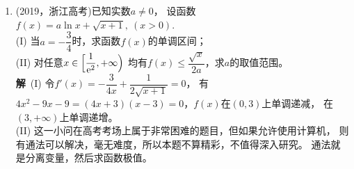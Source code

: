 \begin{enumerate}[label={【\textbf{例\thechapter.\arabic*}】},
 leftmargin=\inteval{\myenumleftmargin}pt,
 itemsep=\inteval{\myenumitempsep}pt,
 itemindent=\inteval{\myenumitemindent}pt]
令$ \ln\sqrt{2}=\ln(b-1+\sqrt{b^2-2b}) $，解得$ b=\dfrac{4+3\sqrt{2}}{4} $.那么当$ b=\dfrac{4+3\sqrt{2}}{4} $时，
$ g(x) $在$ (0,\ln\sqrt{2}) $上单调递减，
\begin{gather*}
    g(\ln\sqrt{2})=-\dfrac{3}{2}-2\sqrt{2}+(3\sqrt{2}-2)
    \ln 2<g(0)=0 \\
    \ln 2<\dfrac{18+\sqrt{2}}{18}<0.6934
\end{gather*}
所以，$ \ln 2 $的近似值为$ 0.693 $. \\
\textbf{注}：面对第(III)问，首先容易想到的是$ f(\ln\sqrt{2})=\dfrac{\sqrt{2}}{2}
-\ln 2>0 $，$ \ln 2<\dfrac{\sqrt{2}}{2}<0.70715 $，这个数字太大了，
根本达不到$ 0.001 $的精度。为何利用$ g(x) $就能提高估算精度呢？
这是因为，当$ |x| $很小时，$ g(x) $比$ f(x) $更贴近$ x $轴。
\begin{figure}[!ht]
    \centering
    \texttt{[image: 2014新课标全国II卷]}
\end{figure}

$ f(2x) $在原点处的5次泰勒展开为$ \dfrac{8}{3}x^3+\dfrac{8}{15}x^5 $；
当$ b=2 $时，$ 8f(x) $在原点处的5次泰勒展开为$ \dfrac{8}{3}x^3
+\dfrac{2}{15}x^5 $，所以，$ b=2 $的效果就是让$ f(2x)-4bf(x) $
在原点处的泰勒展开没有3次项。

\item (2019，浙江高考)已知实数$ a\neq 0 $，
设函数$ f(x)=a\ln x+\sqrt{x+1},\ (x>0) $.\\
(I) 当$ a=-\dfrac{3}{4} $时，求函数$ f(x) $的单调区间；\\
(II) 对任意$ x\in \Big[\dfrac{1}{\mathrm{e}^2},+\infty\Big) $
均有$ f(x)\leq \dfrac{\sqrt{x}}{2a} $，求$ a $的取值范围。\\
\textbf{解}\ (I) 令$ f'(x)=-\dfrac{3}{4x}+\dfrac{1}{2\sqrt{x+1}}=0 $，
有$ 4x^2-9x-9=(4x+3)(x-3)=0 $，$ f(x) $在$ (0,3) $上单调递减，
在$ (3,+\infty) $上单调递增。\\
(II) 这一小问在高考考场上属于非常困难的题目，但如果允许使用计算机，
则有通法可以解决，毫无难度，所以本题不算精彩，不值得深入研究。
通法就是分离变量，然后求函数极值。


\end{enumerate}
